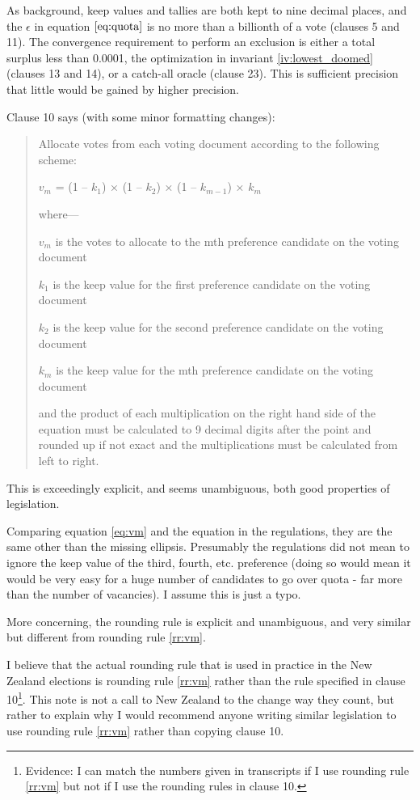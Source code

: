\documentclass{article}
\begin{document}
As background, keep values and tallies are both kept
to nine decimal places, and the $\epsilon$
in equation $\ref{eq:quota}$ is no more than a billionth of a vote (clauses 5 and 11). 
The convergence requirement to perform an exclusion is either a total surplus
less than 0.0001, the optimization in invariant \ref{iv:lowest_doomed} 
(clauses 13 and 14), or a catch-all oracle (clause 23). This is sufficient
precision that little would be gained by higher precision.


Clause 10 says (with some minor formatting changes):
\begin{quote}
Allocate votes from each voting document according to the following scheme:

      $v_m$ = (1 – $k_1$) × (1 – $k_2$) × (1 – $k_{m-1}$) × $k_m$

where—

$v_m$ is the votes to allocate to the mth preference candidate on the voting document

$k_1$ is the keep value for the first preference candidate on the voting document

$k_2$ is the keep value for the second preference candidate on the voting document

$k_m$ is the keep value for the mth preference candidate on the voting document

and the product of each multiplication on the right hand side of the equation must be calculated to 9 decimal digits after the point and rounded up if not exact and the multiplications must be calculated from left to right.
\end{quote}

This is exceedingly explicit, and seems unambiguous, both good properties 
of legislation. 

Comparing equation \ref{eq:vm} and the equation in the regulations,
they are the same other than the missing ellipsis. Presumably the regulations
did not mean to ignore the keep value of the third, fourth, etc. preference
(doing so would mean it would be very easy for a huge number of candidates to
go over quota - far more than the number of vacancies). I assume this is
just a typo.

More concerning, the rounding rule is explicit and unambiguous, and very
similar but different from rounding rule \ref{rr:vm}.

I believe that the actual rounding rule that is used in practice
in the New Zealand elections is rounding rule \ref{rr:vm} rather than
the rule specified in clause 10\footnote{Evidence: I can match the numbers
given in transcripts if I use rounding rule \ref{rr:vm} but not if I
use the rounding rules in clause 10.}. This note is not a 
call to New Zealand to the change way they count, but rather to explain why
I would recommend anyone writing similar legislation to use rounding rule
\ref{rr:vm} rather than copying clause 10.
\end{document}
